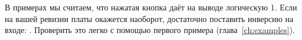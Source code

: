 \begin{infobox}[Кнопки]
В примерах мы считаем, что нажатая кнопка даёт на выводе логическую 1. Если на вашей
ревизии платы окажется наоборот, достаточно поставить инверсию на входе:
. Проверить это легко с помощью первого примера
(глава~\ref{ch:examples}).
\end{infobox}
